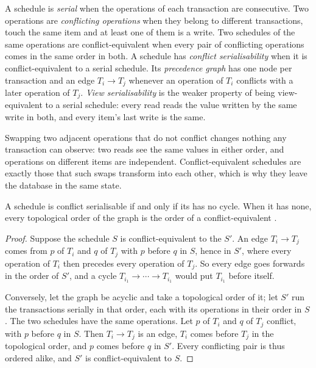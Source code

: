 \begin{definition}\label{def:b3:transactions-and-recovery:schedule}
A schedule is \emph{serial} when the operations of each transaction are consecutive. Two operations are \emph{conflicting operations} when they belong to different transactions, touch the same item and at least one of them is a write. Two schedules of the same operations are conflict-equivalent when every pair of conflicting operations comes in the same order in both. A schedule has \emph{conflict serialisability} when it is conflict-equivalent to a serial schedule. Its \emph{precedence graph} has one node per transaction and an edge $T_i \to T_j$ whenever an operation of $T_i$ conflicts with a later operation of $T_j$. \emph{View serialisability} is the weaker property of being view-equivalent to a serial schedule: every read reads the value written by the same write in both, and every item's last write is the same.
\end{definition}

Swapping two adjacent operations that do not conflict changes nothing any transaction can observe: two reads see the same values in either order, and operations on different items are independent. Conflict-equivalent schedules are exactly those that such swaps transform into each other, which is why they leave the database in the same state.

\begin{theorem}\label{thm:b3:transactions-and-recovery:precedence}
A schedule is conflict serialisable if and only if its  has no cycle. When it has none, every topological order of the graph is the order of a conflict-equivalent .
\end{theorem}

\begin{proof}
Suppose the schedule $S$ is conflict-equivalent to the  $S'$. An edge $T_i \to T_j$ comes from  $p$ of $T_i$ and $q$ of $T_j$ with $p$ before $q$ in $S$, hence in $S'$, where every operation of $T_i$ then precedes every operation of $T_j$. So every edge goes forwards in the order of $S'$, and a cycle $T_{i_1} \to \cdots \to T_{i_1}$ would put $T_{i_1}$ before itself.

Conversely, let the graph be acyclic and take a topological order of it; let $S'$ run the transactions serially in that order, each with its operations in their order in $S$. The two schedules have the same operations. Let $p$ of $T_i$ and $q$ of $T_j$ conflict, with $p$ before $q$ in $S$. Then $T_i \to T_j$ is an edge, $T_i$ comes before $T_j$ in the topological order, and $p$ comes before $q$ in $S'$. Every conflicting pair is thus ordered alike, and $S'$ is conflict-equivalent to $S$.
\end{proof}


